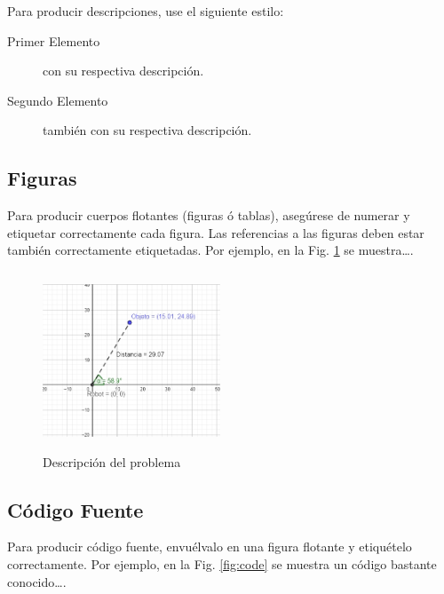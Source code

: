 \documentclass[a4paper,10pt]{article}
\begin{document}
		Para producir descripciones, use el siguiente estilo:

		\begin{description}
			\item [Primer Elemento] con su respectiva descripción.
			\item [Segundo Elemento] también con su respectiva descripción.
		\end{description}

	\subsection{Figuras}\label{sub:figures}
	

		Para producir cuerpos flotantes (figuras ó tablas), asegúrese de numerar
		y etiquetar correctamente cada figura. Las referencias a las figuras deben
		estar también correctamente etiquetadas. Por ejemplo, en la Fig. \ref{fig:arr}
		se muestra\ldots.

		\begin{figure}[htb]%
		\begin{center}
		\includegraphics[width=200px, height=200px]{images/problem_description.jpg}
		\end{center}
		\caption{Descripción del problema \label{fig:arr}}%
		\end{figure}

	\subsection{Código Fuente}\label{sub:listings}
		Para producir código fuente, envuélvalo en una figura flotante y
		etiquételo correctamente. Por ejemplo, en la Fig. \ref{fig:code}
		se muestra un código bastante conocido\ldots.
\end{document}
